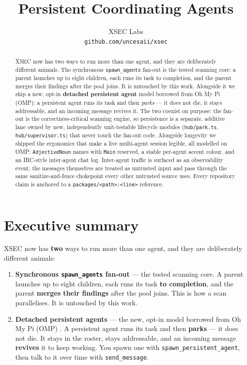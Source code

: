 \documentclass[11pt]{article}
\title{Persistent Coordinating Agents}
\author{
  XSEC Labs \\
  \texttt{github.com/uncesaii/xsec}
}
\date{}
\begin{document}
\maketitle

\begin{abstract}
XSEC now has two ways to run more than one agent, and they are deliberately
different animals. The synchronous \texttt{spawn\_agents} fan-out is the tested
scanning core: a parent launches up to eight children, each runs its task to
completion, and the parent merges their findings after the pool joins. It is
untouched by this work. Alongside it we ship a new, opt-in \textbf{detached
persistent agent} model borrowed from Oh My Pi (OMP): a persistent agent runs its
task and then \textit{parks} --- it does not die, it stays addressable, and an
incoming message revives it. The two coexist on purpose: the fan-out is the
correctness-critical scanning engine, so persistence is a separate, additive lane
owned by new, independently unit-testable lifecycle modules
(\texttt{hub/park.ts}, \texttt{hub/supervisor.ts}) that never touch the fan-out
code. Alongside longevity we shipped the ergonomics that make a live multi-agent
session legible, all modelled on OMP: \texttt{AdjectiveNoun} names with
\texttt{Main} reserved, a stable per-agent accent colour, and an IRC-style
inter-agent chat log. Inter-agent traffic is surfaced as an observability event;
the messages themselves are treated as untrusted input and pass through the same
sanitize-and-fence chokepoint every other untrusted source uses. Every repository
claim is anchored to a \texttt{packages/<path>:<line>} reference.
\end{abstract}

\section{Executive summary}

XSEC now has \textbf{two} ways to run more than one agent, and they are
deliberately different animals:

\begin{enumerate}[leftmargin=*]
  \item \textbf{Synchronous \texttt{spawn\_agents} fan-out} --- the tested
  scanning core. A parent launches up to eight children, each runs its task
  \textbf{to completion}, and the parent \textbf{merges their findings} after the
  pool joins. This is how a scan parallelises. It is untouched by this work.
  \item \textbf{Detached persistent agents} --- the new, opt-in model borrowed
  from Oh My Pi (OMP) \citep{omp}. A persistent agent runs its task and then
  \textbf{parks} --- it does not die. It stays in the roster, stays addressable,
  and an incoming message \textbf{revives} it to keep working. You spawn one with
  \texttt{spawn\_persistent\_agent}, then talk to it over time with
  \texttt{send\_message}.
\end{enumerate}
\end{document}
